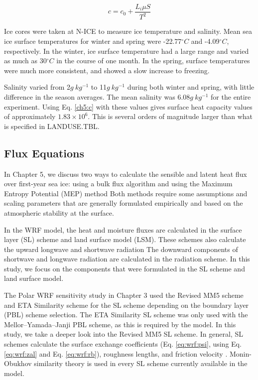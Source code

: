\begin{equation}\label{ch5:c}
c = c_{0} + \frac{L_{i}\mu S}{T^{2}}
\end{equation}

Ice cores were taken at N-ICE to measure ice temperature and salinity. Mean sea ice surface temperatures for winter and spring were -22.77$^{\circ}C$ and -4.09$^{\circ}C$, respectively. In the winter, ice surface temperature had a large range and varied as much as 30$^{\circ}C$ in the course of one month. In the spring, surface temperatures were much more consistent, and showed a slow increase to freezing.

Salinity varied from 2$g~kg^{-1}$ to 11$g~kg^{-1}$ during both winter and spring, with little difference in the season averages. The mean salinity was 6.08$g~kg^{-1}$ for the entire experiment. Using Eq. \ref{ch5:c} with these values gives surface heat capacity values of approximately $1.83 \times 10^{6}$. This is several orders of magnitude larger than what is specified in LANDUSE.TBL.

\subsection{Flux Equations}
In Chapter 5, we discuss two ways to calculate the sensible and latent heat flux over first-year sea ice: using a bulk flux algorithm \citep{foken:2008} and using the Maximum Entropy Potential (MEP) method \citep{zhang:2021, wang:2014, wang:2009} Both methods require some assumptions and scaling parameters that are generally formulated empirically and based on the atmospheric stability at the surface. 

In the WRF model, the heat and moisture fluxes are calculated in the surface layer (SL) scheme and land surface model (LSM). These schemes also calculate the upward longwave and shortwave radiation \citep{dudhia:2014, skamarock:2019} The downward components of shortwave and longwave radiation are calculated in the radiation scheme. In this study, we focus on the components that were formulated in the SL scheme and land surface model. 

The Polar WRF sensitivity study in Chapter 3 used the Revised MM5 scheme \citep{paulson:1970, dyer:1970, webb:1970, beljaars:1994} and ETA Similarity scheme for the SL scheme depending on the boundary layer (PBL) scheme selection. The ETA Similarity SL scheme was only used with the Mellor–Yamada–Janji PBL scheme, as this is required by the model. In this study, we take a deeper look into the Revised MM5 SL scheme. In general, SL schemes calculate the surface exchange coefficients (Eq. \ref{eq:wrf:psi}, using Eq. \ref{eq:wrf:zal} and Eq. \ref{eq:wrf:rb}), roughness lengths, and friction velocity \citep{dudhia:2014}. Monin-Obukhov similarity theory is used in every SL scheme currently available in the model. 

